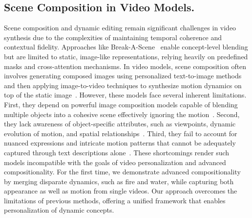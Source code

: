 \subsection{Scene Composition in Video Models.}
Scene composition and dynamic editing remain significant challenges in video synthesis due to the complexities of maintaining temporal coherence and contextual fidelity.
Approaches like Break-A-Scene~\cite{avrahami2023break} enable concept-level blending but are limited to static, image-like representations, relying heavily on predefined masks and cross-attention mechanisms.
In video models, scene composition often involves generating composed images using personalized text-to-image methods~\cite{qian2024omniidholisticidentityrepresentation,wang2024moamixtureofattentionsubjectcontextdisentanglement} and then applying image-to-video techniques to synthesize motion dynamics on top of the static image~\cite{chen2024videoalchemy, ren2024consisti2v,atomovideo,blattmann2023stable,dai2023animateanything,HaCohen2024LTXVideo}.
However, these models face several inherent limitations. First, they depend on powerful image composition models capable of blending multiple objects into a cohesive scene effectively ignoring the motion~\cite{blattmann2023stable,dai2023animateanything}. Second, they lack awareness of object-specific attributes, such as viewpoints, dynamic evolution of motion, and spatial relationships~\cite{blattmann2023stable,dai2023animateanything}.
Third, they fail to account for nuanced expressions and intricate motion patterns that cannot be adequately captured through text descriptions alone~\cite{dai2023animateanything,chen2024videoalchemy}.
These shortcomings render such models incompatible with the goals of video personalization and advanced compositionality.
For the first time, we demonstrate advanced compositionality by merging disparate dynamics, such as fire and water, while capturing both appearance as well as motion from single videos.
Our approach overcomes the limitations of previous methods, offering a unified framework that enables personalization of dynamic concepts.